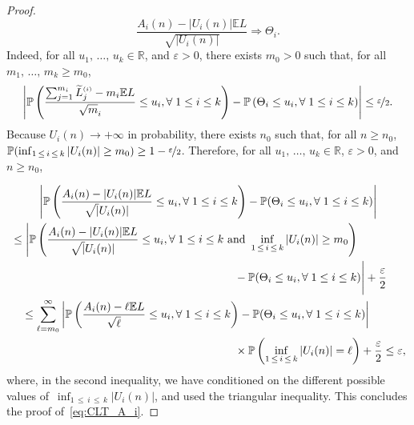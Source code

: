 \documentclass[10pt]{amsart}
\theoremstyle{definition}\newtheorem{defi}[theo]{Definition}\newtheorem{rema}[theo]{Remark}\newtheorem{exam}[theo]{Example}\newtheorem{exem}[theo]{Example}\newtheorem{nota}[theo]{Notation}
\newcommand{\sss}{\ensuremath{\scriptscriptstyle}}
\newcommand{\bbP}{\mathbb{P}}
\newcommand{\bbE}{\mathbb{E}}
\newcommand{\bbR}{\mathbb{R}}
\let\oldforall\forall
\renewcommand*{\forall}{\mathrel{\oldforall}}
\begin{document}
\begin{proof}
\begin{equation}
\frac{A_i(n)-|U_i(n)|\bbE L}{\sqrt{|U_i(n)|}}
\Rightarrow \Theta_i.
\end{equation}
Indeed, for all $u_1,\,\ldots,\, u_k\in\bbR$, and $\varepsilon>0$, there exists $m_0>0$ such that, for all $m_1, \,\ldots,\, m_k\geq m_0$,
\[
\left|\bbP\left(\frac{\sum_{j=1}^{m_i} \widetilde L^{\sss (i)}_j - m_i\bbE L}{\sqrt m_i}\leq u_i, \forall 1\leq i\leq k\right) - \bbP\left(\Theta_i\leq u_i, \forall 1\leq i\leq k\right)\right|\leq \nicefrac\varepsilon2.
\]
Because $U_i(n)\to+\infty$ in probability, there exists $n_0$ such that, for all $n\geq n_0$, $\bbP(\inf_{1\,\leq\,i\,\leq\,k} |U_i(n)|\geq m_0) \geq 1-\nicefrac\varepsilon2$. Therefore, for all $u_1, \,\ldots,\, u_k\in\bbR$, $\varepsilon>0$, and $n\geq n_0$,

\begin{multline*}
\left|\bbP\left(\frac{A_i(n) - |U_i(n)|\bbE L}{\sqrt |U_i(n)|}\leq u_i, \forall 1\leq i\leq k\right) - \bbP(\Theta_i\leq u_i, \forall 1\leq i\leq k)\right|\\
\begin{aligned}
&\leq \Bigg|\bbP\left(\frac{A_i(n) - |U_i(n)|\bbE L}{\sqrt |U_i(n)|}\leq u_i, \forall 1\leq i\leq k \text{ and }\inf_{1\,\leq\,i\,\leq \,k}|U_i(n)|\geq m_0\right) \\
&\hskip20em - \bbP(\Theta_i\leq u_i, \forall 1\leq i\leq k)\Bigg| + \frac\varepsilon2\\
&\quad \leq \sum_{\ell = m_0}^\infty \left|\bbP\left(\frac{A_i(n) - \ell\bbE L}{\sqrt \ell}\leq u_i, \forall 1\leq i\leq k\right) - \bbP(\Theta_i\leq u_i, \forall 1\leq i\leq k)\right| \\
&\hskip20em\times\bbP\left(\inf_{1\,\leq\,i\,\leq\,k}|U_i(n)|=\ell\right) + \frac\varepsilon2\leq \varepsilon,
\end{aligned}
\end{multline*}
where, in the second inequality, we have conditioned on the different possible values of~$\inf_{1\,\leq\,i\,\leq\,k}|U_i(n)|$, and used the triangular inequality. This concludes the proof of~\eqref{eq:CLT_A_i}.


\end{proof}
\end{document}
